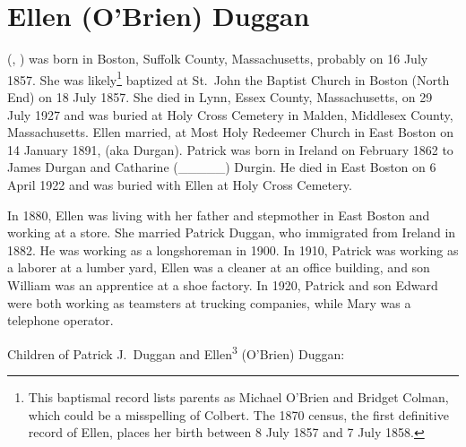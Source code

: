 \section{Ellen (O'Brien) Duggan}\label{per:Ellen3OBrien}

 (, ) was born in Boston, Suffolk County, Massachusetts, probably on 16 July 1857.\cite{Ellen3OBrien3Birth} She was likely\footnote{This baptismal record lists parents as Michael O'Brien and Bridget Colman, which could be a misspelling of Colbert. The 1870 census, the first definitive record of Ellen, places her birth between 8 July 1857 and 7 July 1858.} baptized at St.\ John the Baptist Church in Boston (North End) on 18 July 1857.\cite{Ellen3OBrien3Baptism} She died in Lynn, Essex County, Massachusetts, on 29 July 1927 and was buried at Holy Cross Cemetery in Malden, Middlesex County, Massachusetts.\cite{Ellen3OBrien3Death} Ellen married, at Most Holy Redeemer Church in East Boston on 14 January 1891,  (aka Durgan).\cite{Ellen3OBrien3Marriage:1} Patrick was born in Ireland on February 1862\cite{Census1900Ellen3OBrien3} to James Durgan and Catharine (\_\_\_\_\_) Durgin.\cite{Ellen3OBrien3Marriage:2} He died in East Boston on 6 April 1922 and was buried with Ellen at Holy Cross Cemetery.\cite{PatrickDugganDeath}

In 1880, Ellen was living with her father and stepmother in East Boston and working at a store.\cite{Census1880Ellen3OBrien3} She married Patrick Duggan, who immigrated from Ireland in 1882. He was working as a longshoreman in 1900.\cite{Census1900Ellen3OBrien3} In 1910, Patrick was working as a laborer at a lumber yard, Ellen was a cleaner at an office building, and son William was an apprentice at a shoe factory.\cite{Census1910Ellen3OBrien3} In 1920, Patrick and son Edward were both working as teamsters at trucking companies, while Mary was a telephone operator.\cite{Census1920Ellen3OBrien3}

\begin{KidsIntro}
	Children of Patrick J.\ Duggan and Ellen\textsuperscript{3} (O'Brien) Duggan:
\end{KidsIntro}

